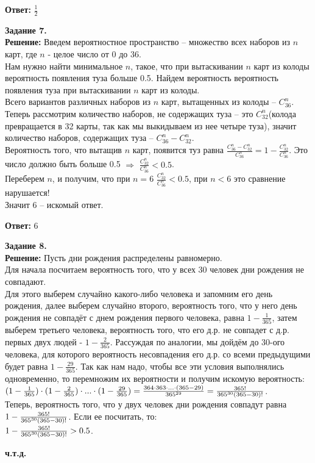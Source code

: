 \documentclass[12pt,a4paper]{scrartcl}
\begin{document}
	\begin{flushright}
		\textbf{Ответ:} $\frac{1}{2}$
	\end{flushright}
	\textbf{Задание 7.} 
	\\
	\textbf{Решение:} Введем вероятностное пространство -- множество всех наборов из $n$ карт, где $n$ - целое число от 0 до 36. \\
	Нам нужно найти минимальное $n$, такое, что при вытаскивании $n$ карт из колоды вероятность появления туза больше 0.5.
	Найдем вероятность вероятность появления туза при вытаскивании $n$ карт из колоды. \\
	Всего вариантов различных наборов из $n$ карт, вытащенных из колоды -- $C_{36}^{n}$.\\
	Теперь рассмотрим количество наборов, не содержащих туза -- это $C_{32}^{n}$(колода превращается в 32 карты, так как мы выкидываем из нее четыре туза), значит количество наборов, содержащих туза -- $C_{36}^{n} - C_{32}^{n}$. \\
	Вероятность того, что вытащив $n$ карт, появится туз равна $\frac{C_{36}^{n} - C_{32}^{n}}{C_{36}^{n}} = 1 - \frac{C_{32}^{n}}{C_{36}^{n}}$. Это число должно быть больше 0.5 $\Rightarrow$ $\frac{C_{32}^{n}}{C_{36}^{n}} < 0.5$.\\
	Переберем $n$, и получим, что при $n=6$ $\frac{C_{32}^{n}}{C_{36}^{n}} < 0.5$, при $n < 6$ это сравнение нарушается! \\
	Значит 6 -- искомый ответ.
	
	\begin{flushright}
		\textbf{Ответ:} 6
	\end{flushright}
	\textbf{Задание 8.} 
	\\
	\textbf{Решение:} Пусть дни рождения распределены равномерно.\\
	Для начала посчитаем вероятность того, что у всех 30 человек дни рождения не совпадают. \\
	Для этого выберем случайно какого-либо человека и запомним его день рождения, далее выберем случайно второго, вероятность того, что у него день рождения не совпадёт с днем рождения первого человека, равна $1 - {\frac{1}{365}}$, затем выберем третьего человека, вероятность того, что его д.р. не совпадет с д.р. первых двух людей - $1 - {\frac{2}{365}}$. Рассуждая по аналогии, мы дойдём до 30-ого человека, для которого вероятность несовпадения его д.р. со всеми предыдущими будет равна $1 - {\frac{29}{365}}$.
	Так как нам надо, чтобы все эти условия выполнялись одновременно, то перемножим их вероятности и получим искомую вероятность: \\
	$(1 - {\frac{1}{365}}) \cdot (1 - {\frac{2}{365}}) \cdot ... \cdot (1 - {\frac{29}{365}}) = \frac{364 \cdot 363 \cdot ... \cdot (365 - 29)}{365^{29}} =  { 365! \over 365^{30} (365-30)! }$.\\
	Теперь, вероятность того, что у двух человек дни рождения совпадут равна \\ 
	$1 - { 365! \over 365^{30} (365-30)!}$. Если ее посчитать, то: \\ 
	$1 - { 365! \over 365^{30} (365-30)!} > 0.5$.
	\begin{flushright}
		\textbf{ч.т.д.}
	\end{flushright}
\end{document}

